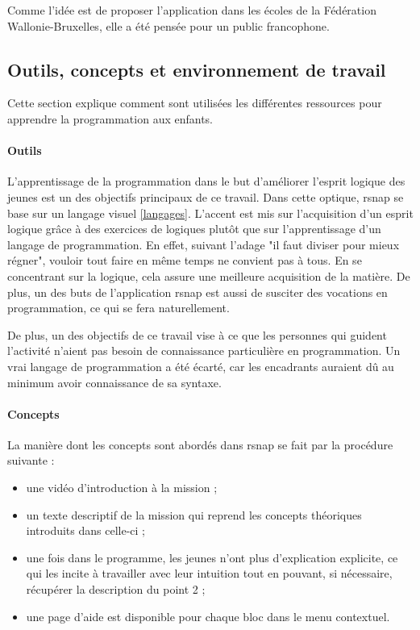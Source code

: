 Comme l'idée est de proposer l'application dans les écoles de la Fédération Wallonie-Bruxelles, elle a été pensée pour un public francophone.

\subsection{Outils, concepts et environnement de travail}
Cette section explique comment sont utilisées les différentes ressources pour apprendre la programmation aux enfants.

\paragraph{Outils}
\label{outil}
L'apprentissage de la programmation dans le but d'améliorer l'esprit logique des jeunes est un des objectifs principaux de ce travail. Dans cette optique, \gls{rsnap} se base sur un langage visuel \ref{langages}. L'accent est mis sur l'acquisition d'un esprit logique grâce à des exercices de logiques plutôt que sur l'apprentissage d'un langage de programmation.  En effet, suivant l'adage "il faut diviser pour mieux régner", vouloir tout faire en même temps ne convient pas à tous. En se concentrant sur la logique, cela assure une meilleure acquisition de la matière. De plus, un des buts de l'application \gls{rsnap} est aussi de susciter des vocations en programmation, ce qui se fera naturellement.

De plus, un des objectifs de ce travail vise à ce que les personnes qui guident l'activité n'aient pas besoin de connaissance particulière en programmation. Un vrai langage de programmation a été écarté, car les encadrants auraient dû au minimum avoir connaissance de sa syntaxe.

\paragraph{Concepts}
La manière dont les concepts sont abordés dans \gls{rsnap} se fait par la procédure suivante :
\begin{itemize}
	\item une vidéo d'introduction à la \gls{mission} ;
	\item un texte descriptif de la \gls{mission} qui reprend les concepts théoriques introduits dans celle-ci ;
	\item une fois dans le programme, les jeunes n'ont plus d'explication explicite, ce qui les incite à travailler avec leur intuition tout en pouvant, si nécessaire, récupérer la description du point 2 ;
	\item une page d'aide est disponible pour chaque \gls{bloc} dans le menu contextuel.
\end{itemize}

